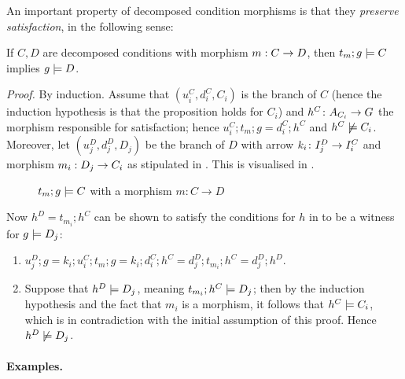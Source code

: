 \medskip\noindent An important property of decomposed condition morphisms is that they \emph{preserve satisfaction}, in the following sense:
%
\begin{proposition}
If $C,D$ are decomposed conditions with morphism $m:C\rightarrow D$, then $t_m;g\models C$ implies $g\models D$.
\end{proposition}
%
\emph{Proof.} By induction. Assume that $(u_i^C,d_i^C,C_i)$ is the branch of $C$ (hence the induction hypothesis is that the proposition holds for $C_i$) and $h^C\colon A_{C_i}\rightarrow G$ the morphism responsible for satisfaction; hence $u_i^C;t_m;g=d_i^C;h^C$ and $h^C\not\models C_i$. Moreover, let $(u_j^D,d_j^D,D_j)$ be the branch of $D$ with arrow $k_i\colon I_j^D\rightarrow I_i^C$ and morphism $m_i:D_j\rightarrow C_i$ as stipulated in . This is visualised in .
%
\begin{figure}
  \centering
  
  \caption{$t_m;g\models C$ with a morphism $m:C\rightarrow D$}
\end{figure}

Now $h^D=t_{m_i};h^C$ can be shown to satisfy the conditions for $h$ in  to be a witness for $g\models D_j$:
\begin{enumerate}
\item $u_j^D;g = k_i;u_i^C;t_m;g= k_i;d_i^C;h^C = d_j^D;t_{m_i};h^C=d_j^D;h^D$.
\item Suppose that $h^D\models D_j$, meaning $t_{m_i};h^C\models D_j$; then by the induction hypothesis and the fact that $m_i$ is a morphism, it follows that $h^C\models C_i$, which is in contradiction with the initial assumption of this proof. Hence $h^D\not\models D_j$.
\end{enumerate}
%
\paragraph{Examples.}


